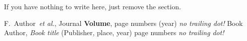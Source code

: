 \documentclass[epj]{webofc}
\begin{document}
\begin{acknowledgement}
If you have nothing to write here, just remove the section.
\end{acknowledgement}
%
% 
%
%
\begin{thebibliography}{00}
%
%
F.~Author~\textit{et al.}, Journal \textbf{Volume}, page numbers (year) {\em{no trailing dot!}}
Book Author, \textit{Book title} (Publisher, place, year) page numbers {\em{no trailing dot!}}
\end{thebibliography}
\end{document}
